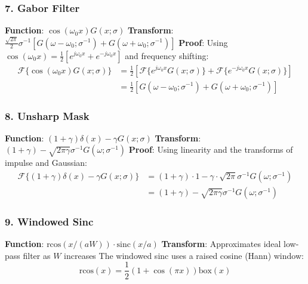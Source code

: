 \documentclass[12pt,a4paper]{article}
\begin{document}
\subsubsection*{7. Gabor Filter}
\textbf{Function}: $\cos(\omega_0 x)G(x; \sigma)$
\newline
\textbf{Transform}: $\frac{\sqrt{2\pi}}{2}\sigma^{-1}[G(\omega - \omega_0; \sigma^{-1}) + G(\omega + \omega_0; \sigma^{-1})]$
\newline
\textbf{Proof}: Using $\cos(\omega_0 x) = \frac{1}{2}[e^{j\omega_0 x} + e^{-j\omega_0 x}]$ and frequency shifting:
\begin{align*}
\mathcal{F}\{\cos(\omega_0 x)G(x; \sigma)\} &= \frac{1}{2}[\mathcal{F}\{e^{j\omega_0 x}G(x; \sigma)\} + \mathcal{F}\{e^{-j\omega_0 x}G(x; \sigma)\}]\\
&= \frac{1}{2}[G(\omega - \omega_0; \sigma^{-1}) + G(\omega + \omega_0; \sigma^{-1})]
\end{align*}

\subsubsection*{8. Unsharp Mask}
\textbf{Function}: $(1 + \gamma)\delta(x) - \gamma G(x; \sigma)$
\newline
\textbf{Transform}: $(1 + \gamma) - \sqrt{2\pi\gamma}\sigma^{-1} G(\omega; \sigma^{-1})$
\newline
\textbf{Proof}: Using linearity and the transforms of impulse and Gaussian:
\begin{align*}
\mathcal{F}\{(1 + \gamma)\delta(x) - \gamma G(x; \sigma)\} &= (1 + \gamma) \cdot 1 - \gamma \cdot \sqrt{2\pi}\sigma^{-1} G(\omega; \sigma^{-1})\\
&= (1 + \gamma) - \sqrt{2\pi\gamma}\sigma^{-1} G(\omega; \sigma^{-1})
\end{align*}

\subsubsection*{9. Windowed Sinc}
\textbf{Function}: $\text{rcos}(x/(aW)) \cdot \text{sinc}(x/a)$
\newline
\textbf{Transform}: Approximates ideal low-pass filter as $W$ increases
\newline
The windowed sinc uses a raised cosine (Hann) window:
\begin{equation*}
\text{rcos}(x) = \frac{1}{2}(1 + \cos(\pi x))\text{box}(x)
\end{equation*}
\end{document}
